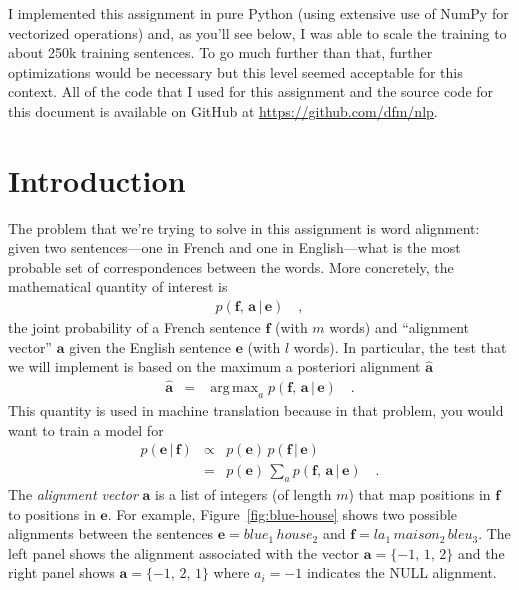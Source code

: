 \documentclass[11pt]{article}
\newcommand{\eqlabel}[1]{\label{eq:#1}}
\newcommand{\fig}[1]{Figure~\ref{fig:#1}}
\newcommand{\bvec}[1]{\ensuremath{\boldsymbol{#1}}}
\newcommand{\code}[1]{{\sffamily #1}}
\DeclareMathOperator*{\argmax}{arg\,max}
\begin{document}
I implemented this assignment in pure Python (using extensive use of NumPy for
vectorized operations) and, as you'll see below, I was able to scale the
training to about 250k training sentences.
To go much further than that, further optimizations would be necessary but
this level seemed acceptable for this context.
All of the code that I used for this assignment and the source code for this
document is available on GitHub at \url{https://github.com/dfm/nlp}.

\section{Introduction}

The problem that we're trying to solve in this assignment is word alignment:
given two sentences---one in French and one in English---what is the most
probable set of correspondences between the words.
More concretely, the mathematical quantity of interest is
\begin{eqnarray}\eqlabel{prob}
    p (\bvec{f},\,\bvec{a}\,|\,\bvec{e})\quad,
\end{eqnarray}
the joint probability of a French sentence $\bvec{f}$ (with $m$ words) and
``alignment vector'' $\bvec{a}$ given the English sentence $\bvec{e}$ (with
$l$ words).
In particular, the test that we will implement is based on the maximum
a posteriori alignment $\hat{\bvec{a}}$
\begin{eqnarray}
\hat{\bvec{a}} &=& \argmax_a p (\bvec{f},\,\bvec{a}\,|\,\bvec{e}) \quad.
\end{eqnarray}
This quantity is used in machine translation because in that problem, you
would want to train a model for
\begin{eqnarray}
p(\bvec{e}\,|\,\bvec{f}) &\propto&
    p(\bvec{e})\,p(\bvec{f}\,|\,\bvec{e}) \nonumber\\
    &=& p(\bvec{e})\,
        \sum_a p (\bvec{f},\,\bvec{a}\,|\,\bvec{e}) \quad.
\end{eqnarray}
The \emph{alignment vector} $\bvec{a}$ is a list of integers (of length $m$)
that map positions in $\bvec{f}$ to positions in $\bvec{e}$.
For example, \fig{blue-house} shows two possible alignments between the
sentences $\bvec{e} = blue_1\,house_2$ and
$\bvec{f} = la_1\,maison_2\,bleu_3$.
The left panel shows the alignment associated with the vector
$\bvec{a} = \{-1,\,1,\,2\}$ and the right panel shows $\bvec{a} =
\{-1,\,2,\,1\}$ where $a_i=-1$ indicates the \code{NULL} alignment.
\end{document}
